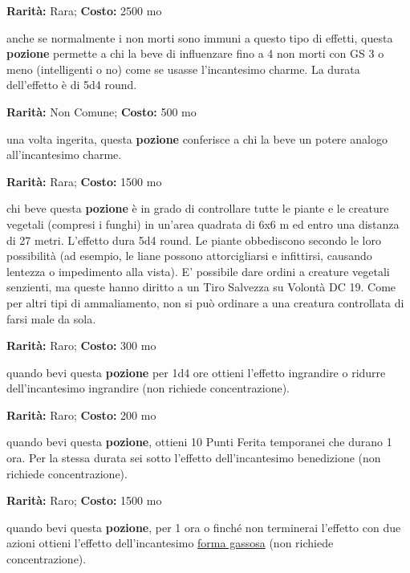 \begin{multicols}{2}

\textbf{Rarità:} Rara; \textbf{Costo:} 2500 mo

anche se normalmente i non morti sono immuni a questo tipo di effetti, questa \textbf{pozione} permette a chi la beve di influenzare fino a 4 non morti con GS 3 o meno (intelligenti o no) come se usasse l'incantesimo charme. La durata dell'effetto è di 5d4 round.


\textbf{Rarità:} Non Comune; \textbf{Costo:} 500 mo

una volta ingerita, questa \textbf{pozione} conferisce a chi la beve un potere analogo all'incantesimo charme.


\textbf{Rarità:} Rara; \textbf{Costo:} 1500 mo

chi beve questa \textbf{pozione} è in grado di controllare tutte le piante e le creature vegetali (compresi i funghi) in un'area quadrata di 6x6 m ed entro una distanza di 27 metri. L'effetto dura 5d4 round. Le piante obbediscono secondo le loro possibilità (ad esempio, le liane possono attorcigliarsi e infittirsi, causando lentezza o impedimento alla vista). E' possibile dare ordini a creature vegetali senzienti, ma queste hanno diritto a un Tiro Salvezza su Volontà DC 19. Come per altri tipi di ammaliamento, non si può ordinare a una creatura controllata di farsi male da sola.


\textbf{Rarità:} Raro; \textbf{Costo:} 300 mo

quando bevi questa \textbf{pozione} per 1d4 ore ottieni l'effetto ingrandire o ridurre dell'incantesimo ingrandire (non richiede concentrazione).


\textbf{Rarità:} Raro; \textbf{Costo:} 200 mo

quando bevi questa \textbf{pozione}, ottieni 10 Punti Ferita temporanei che durano 1 ora. Per la stessa durata sei sotto l'effetto dell'incantesimo benedizione (non richiede concentrazione).


\textbf{Rarità:} Raro; \textbf{Costo:} 1500 mo

quando bevi questa \textbf{pozione}, per 1 ora o finché non terminerai l'effetto con due azioni ottieni l'effetto dell'incantesimo \hyperlink{PozionediFormaGassosa}{forma gassosa} (non richiede concentrazione).


\end{multicols}
